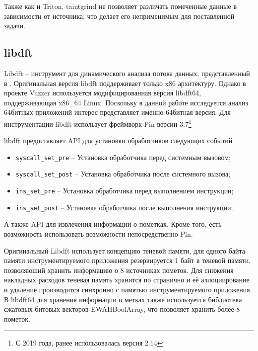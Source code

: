 Также как и Triton, taintgrind не позволяет различать помеченные данные в зависимости от источника, что делает его неприменимым для поставленной задачи.

\subsection{libdft}

Libdft -- инструмент для динамического анализа потока данных, представленный в \cite{libdft}. Оригинальная версия libdft поддерживает только x86 архитектуру. Однако в проекте Vuzzer \cite{vuzzer} используется модифицированная версия libdft64, поддерживающая x86\_64 Linux. Поскольку в данной работе исследуется анализ 64битных приложений интерес представляет именно 64битная версия.
Для инструментации libdft использует фреймворк Pin версии $3.7$\footnote{С 2019 года, ранее использовалась версия $2.14$}



libdft предоставляет API для установки обработчиков следующих событий
\begin{itemize}
    \item \texttt{syscall\_set\_pre} -- Установка обработчика перед системным вызовом;
    \item \texttt{syscall\_set\_post} -- Установка обработчика после системного вызова;
    \item \texttt{ins\_set\_pre} -- Установка обработчика перед выполнением инструкции;
    \item \texttt{ins\_set\_post} -- Установка обработчика после выполнения инструкции;
\end{itemize}
А также API для извлечения информации о пометках. Кроме того, есть возможность использовать возможности непосредственно Pin.

Оригинальный Libdft использует концепцию теневой памяти, для одного байта памяти инструментируемого приложения резервируется 1 байт в теневой памяти, позволяюший хранить информацию о 8 источниках пометок. Для снижения накладных расходов теневая память хранится по странично и её аллоциирование и удаление производится синхронно с памятью инструментируемого приложения.
В libdft64 для хранения информации о метках также используется библиотека сжатовых битовых векторов EWAHBoolArray, что позволяет хранить более 8 пометок.

